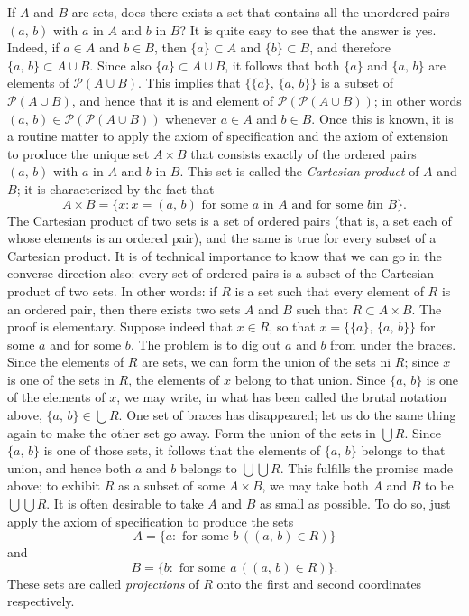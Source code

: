 If $A$ and $B$ are sets, does there exists a set that contains all the unordered pairs $(a, \, b)$ with $a$ in $A$ and $b$ in $B$? It is quite easy to see that the answer is yes. Indeed, if $a \in A$ and $b \in B$, then $\{a\} \subset A$ and $\{b\} \subset B$, and therefore $\{a, \, b\} \subset A \cup B$. Since also $\{a\} \subset A \cup B$, it follows that both $\{a\}$ and $\{a, \, b\}$ are elements of $\mathcal{P}(A \cup B)$. This implies that $\{ \{a\}, \, \{a, \, b\}\}$ is a subset of $\mathcal{P}(A \cup B)$, and hence that it is and element of $\mathcal{P}(\mathcal{P}(A \cup B))$; in other words $(a, \, b) \in \mathcal{P}(\mathcal{P}(A \cup B))$ whenever $a \in A$ and $b \in B$. Once this is known, it is a routine matter to apply the axiom of specification and the axiom of extension to produce the unique set $A \times B$ that consists exactly of the ordered pairs $(a, \, b)$ with $a$ in $A$ and $b$ in $B$. This set is called the \textit{Cartesian product} of $A$ and $B$; it is characterized by the fact that
\[
	A \times B = \{ x : x = (a, \, b) \text{ for some } a \text{ in } A \text{ and for some }b \text{
	 in } B\}.
\]
The Cartesian product of two sets is a set of ordered pairs (that is, a set each of whose elements is an ordered pair), and the same is true for every subset of a Cartesian product. It is of technical importance to know that we can go in the converse direction also: every set of ordered pairs is a subset of the Cartesian product of two sets. In other words: if $R$ is a set such that every element of $R$ is an ordered pair, then there exists two sets $A$ and $B$ such that $R \subset A \times B$. The proof is elementary. Suppose indeed that $x \in R$, so that $x = \{\{a\}, \, \{a, \, b\}\}$ for some $a$ and for some $b$. The problem is to dig out $a$ and $b$ from under the braces. Since the elements of $R$ are sets, we can form the union of the sets ni $R$; since $x$ is one of the sets in $R$, the elements of $x$ belong to that union. Since $\{a, \, b\}$ is one of the elements of $x$, we may write, in what has been called the brutal notation above, $\{a, \, b\} \in \bigcup R$. One set of braces has disappeared; let us do the same thing again to make the other set go away. Form the union of the sets in $\bigcup R$. Since $\{a, \, b\}$ is one of those sets, it follows that the elements of $\{a, \, b\}$ belongs to that union, and hence both $a$ and $b$ belongs to $\bigcup \bigcup R$. This fulfills the promise made above; to exhibit $R$ as a subset of some $A \times B$, we may take both $A$ and $B$ to be $\bigcup \bigcup R$. It is often desirable to take $A$ and $B$ as small as possible. To do so, just apply the axiom of specification to produce the sets
\[
	A = \{ a : \text{ for some } b \, ((a, \, b) \in R)\}
\]
and
\[
	B = \{ b : \text{ for some } a \, ((a, \, b) \in R)\}.
\]
These sets are called \textit{projections} of $R$ onto the first and second coordinates respectively.

